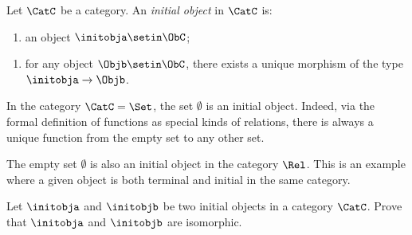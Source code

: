 

\begin{ctdefinition}
Let $\CatC$ be a category. An \emph{initial object} in $\CatC$ is: 

\constit
\begin{enumerate}
\item an object $\initobja \setin \ObC$; 
\end{enumerate}
\condit
\begin{enumerate}
\item for any object $\Objb \setin \ObC$, there exists a unique morphism of the type $\initobja \to \Objb$. 
\end{enumerate}
\end{ctdefinition}

\begin{example}
In the category $\CatC = \Set$, the set $\emptyset$ is an initial object. Indeed, via the formal definition of functions as special kinds of relations, there is always a unique function from the empty set to any other set. 
\end{example}

\begin{example}\label{exa:term-obj-Rel}
The empty set $\emptyset$ is also an initial object in the category $\Rel$. This is an example where a given object is both terminal and initial in the same category. 
\end{example}



\begin{gradedexercise}
Let $\initobja$ and $\initobjb$ be two initial objects in a category $\CatC$.  Prove that $\initobja$ and $\initobjb$ are isomorphic.  
\end{gradedexercise}


